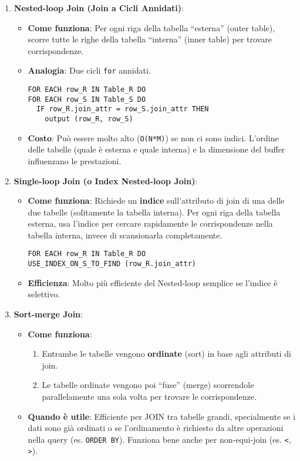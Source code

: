 \begin{enumerate}
    \item \textbf{Nested-loop Join (Join a Cicli Annidati)}:
    \begin{itemize}
        \item \textbf{Come funziona}: Per ogni riga della tabella ``esterna'' (outer table), scorre tutte le righe della tabella ``interna'' (inner table) per trovare corrispondenze.
        \item \textbf{Analogia}: Due cicli \texttt{for} annidati.
        \begin{verbatim}
FOR EACH row_R IN Table_R DO
FOR EACH row_S IN Table_S DO
  IF row_R.join_attr = row_S.join_attr THEN
    output (row_R, row_S)
        \end{verbatim}
        \item \textbf{Costo}: Può essere molto alto (\texttt{O(N*M)}) se non ci sono indici. L'ordine delle tabelle (quale è esterna e quale interna) e la dimensione del buffer influenzano le prestazioni.
    \end{itemize}

    \item \textbf{Single-loop Join (o Index Nested-loop Join)}:
    \begin{itemize}
        \item \textbf{Come funziona}: Richiede un \textbf{indice} sull'attributo di join di una delle due tabelle (solitamente la tabella interna). Per ogni riga della tabella esterna, usa l'indice per cercare rapidamente le corrispondenze nella tabella interna, invece di scansionarla completamente.
        \begin{verbatim}
FOR EACH row_R IN Table_R DO
USE_INDEX_ON_S_TO_FIND (row_R.join_attr)
        \end{verbatim}
        \item \textbf{Efficienza}: Molto più efficiente del Nested-loop semplice se l'indice è selettivo.
    \end{itemize}

    \item \textbf{Sort-merge Join}:
    \begin{itemize}
        \item \textbf{Come funziona}:
        \begin{enumerate}
            \item Entrambe le tabelle vengono \textbf{ordinate} (sort) in base agli attributi di join.
            \item Le tabelle ordinate vengono poi ``fuse'' (merge) scorrendole parallelamente una sola volta per trovare le corrispondenze.
        \end{enumerate}
        \item \textbf{Quando è utile}: Efficiente per JOIN tra tabelle grandi, specialmente se i dati sono già ordinati o se l'ordinamento è richiesto da altre operazioni nella query (es. \texttt{ORDER BY}). Funziona bene anche per non-equi-join (es. \texttt{<}, \texttt{>}).
    \end{itemize}


\end{enumerate}
